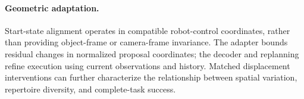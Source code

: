 \paragraph{Geometric adaptation.}
Start-state alignment operates in compatible robot-control coordinates, rather than providing object-frame or camera-frame invariance.
The adapter bounds residual changes in normalized proposal coordinates; the decoder and replanning refine execution using current observations and history.
Matched displacement interventions can further characterize the relationship between spatial variation, repertoire diversity, and complete-task success.
